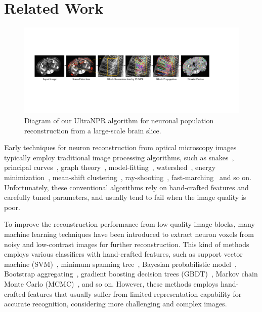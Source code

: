 \section{Related Work}
\label{sec:related work}
\begin{figure}[ht]
	\centering
	\includegraphics[width=1\textwidth]{./Illustrations/framework_ultranpr2.pdf}
	\caption{Diagram of our UltraNPR algorithm for neuronal population reconstruction from a large-scale brain slice.}
	\label{fig:ultra_framework}
\end{figure}


Early techniques for neuron reconstruction from optical microscopy images typically employ traditional image processing algorithms, such as snakes~\cite{Wang2011, Cai2006}, principal curves~\cite{Bas2011}, graph theory~\cite{Peng2010a, Yang2013, De2016}, model-fitting~\cite{Zhao2011, Santamaria2015}, watershed~\cite{Navlakha2013, Suembuel2016}, energy minimization~\cite{Quan2013, Liu2016}, mean-shift clustering~\cite{Frasconi2014}, ray-shooting~\cite{Wu2014, Liu2019}, fast-marching~\cite{Peng2011, Xiao2013, Liu2018} and so on.
Unfortunately, these conventional algorithms rely on hand-crafted features and carefully tuned parameters, and usually tend to fail when the image quality is poor.

To improve the reconstruction performance from low-quality image blocks, many machine learning techniques have been introduced to extract neuron voxels from noisy and low-contrast images for further reconstruction. 
This kind of methods employs various classifiers with hand-crafted features, such as support vector machine (SVM)~\cite{Chen2015}, minimum spanning tree~\cite{Basu2016}, Bayesian probabilistic model~\cite{Radojevic2017}, Bootstrap aggregating~\cite{Wang2017}, gradient boosting decision trees (GBDT)~\cite{Gu2017}, Markov chain Monte Carlo (MCMC)~\cite{Skibbe2015, Skibbe2019}, and so on.
However, these methods employs hand-crafted features that usually suffer from limited representation capability for accurate recognition, considering more challenging and complex images.


